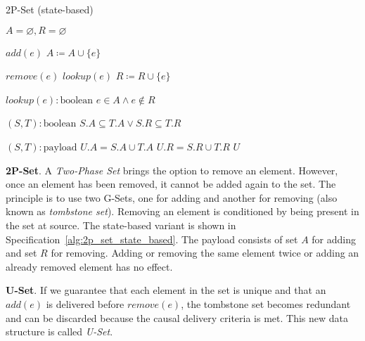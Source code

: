 \begin{algorithm}[t]
\small{
	\caption{2P-Set (state-based)}
 	\label{alg:2p_set_state_based}                       

 	\begin{algorithmic}[1]
 	  \State \Payload $A = \varnothing, R = \varnothing$
 	  
 	  \State \Update $add(e)$
 	  \State \hspace{\algorithmicindent} $A \coloneqq A \cup \{e\}$
 	  
 	  \State \Update $remove(e)$
 	  \State \hspace{\algorithmicindent} \Pre $lookup(e)$
 	  \State \hspace{\algorithmicindent} $R \coloneqq R \cup \{e\}$
 	  
 	  \State \Query $lookup(e) : \text{boolean}$
 	  \State \hspace{\algorithmicindent} \Return $e \in A \land e \not\in R$
 	  
 	  \State \Compare $(S, T) : \text{boolean}$
 	  \State \hspace{\algorithmicindent} \Return $S.A \subseteq T.A \lor S.R \subseteq T.R$ 
 	  
 	  \State \Merge $(S, T) : \text{payload}$
 	  \State \hspace{\algorithmicindent} \Let $U.A = S.A \cup T.A$
 	  \State \hspace{\algorithmicindent} \Let $U.R = S.R \cup T.R$
 	  \State \hspace{\algorithmicindent} \Return $U$
	\end{algorithmic}
 }
\end{algorithm}

\textbf{2P-Set}. A \textit{Two-Phase Set} brings the option to remove an
element. However, once an element has been removed, it cannot be added again to
the set. The principle is to use two G-Sets, one for adding and another for
removing (also known as \textit{tombstone set}). Removing an element is
conditioned by being present in the set at source. The state-based variant is
shown in Specification~\ref{alg:2p_set_state_based}. The payload consists of set
$A$ for adding and set $R$ for removing. Adding or removing the same element
twice or adding an already removed element has no effect.

\textbf{U-Set}. If we guarantee that each element in the set is unique and that
an $\textit{add}(e)$ is delivered before $\textit{remove}(e)$, the tombstone set
becomes redundant and can be discarded because the causal delivery criteria
is met. This new data structure is called \textit{U-Set}.


